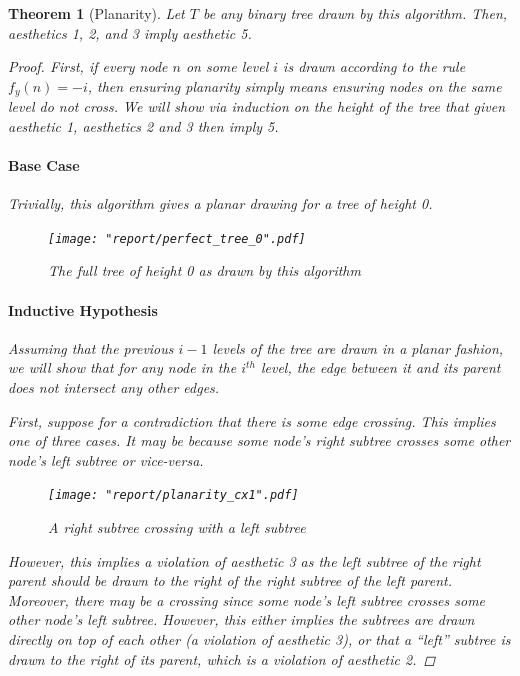 \documentclass[11pt]{report}
\newtheorem{theorem}{Theorem}[section]
\begin{document}
\begin{theorem}[Planarity]
    \label{tree_lp_planar}
    Let $T$ be any binary tree drawn by this algorithm. Then, aesthetics 1, 2, and 3 imply aesthetic 5.
    
    \begin{proof}
        First, if every node $n$ on some level $i$ is drawn according to the rule $f_y(n) = -i$, then ensuring planarity simply means ensuring nodes on the same level do not cross. We will show via induction on the height of the tree that given aesthetic 1, aesthetics 2 and 3 then imply 5.
        
        \bigskip
        
        \paragraph{Base Case} Trivially, this algorithm gives a planar drawing for a tree of height 0.
        
        \begin{figure}[H]
            \centering
            \texttt{[image: "report/perfect\_tree\_0".pdf]}
            \caption{The full tree of height 0 as drawn by this algorithm}
        \end{figure}
        
        \paragraph{Inductive Hypothesis} Assuming that the previous $i - 1$ levels of the tree are drawn in a planar fashion, we will show that for any node in the $i^{th}$ level, the edge between it and its parent does not intersect any other edges.
        
        \bigskip
        
        First, suppose for a contradiction that there is some edge crossing. This implies one of three cases. It may be because some node's right subtree crosses some other node's left subtree or vice-versa.
        
        \begin{figure}[H]
            \centering
            \texttt{[image: "report/planarity\_cx1".pdf]}
            \caption{A right subtree crossing with a left subtree}
        \end{figure}
        
        However, this implies a violation of aesthetic 3 as the left subtree of the right parent should be drawn to the right of the right subtree of the left parent. Moreover, there may be a crossing since some node's left subtree crosses some other node's left subtree. However, this either implies the subtrees are drawn directly on top of each other (a violation of aesthetic 3), or that a ``left'' subtree is drawn to the right of its parent, which is a violation of aesthetic 2.
        

\end{proof}
\end{theorem}
\end{document}
